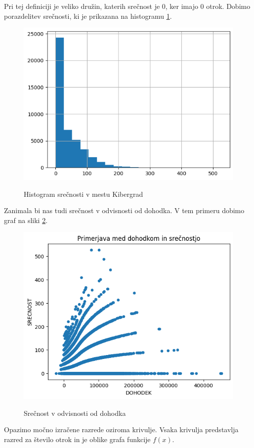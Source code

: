 \documentclass{article}
\begin{document}
Pri tej definiciji je veliko družin, katerih srečnost je 0, ker imajo 0 otrok. Dobimo porazdelitev srečnosti, ki je prikazana na histogramu \ref{fig:slika4}.

\begin{figure}[H]
    \caption{Histogram srečnosti v mestu Kibergrad}
    \centering 
    \includegraphics[scale=0.8]{histogram_srecnosti.png}
    \label{fig:slika4}
\end{figure}

Zanimala bi nas tudi srečnost v odvisnosti od dohodka. V tem primeru dobimo graf na sliki \ref{fig:slika5}.

\begin{figure}[H]
    \caption{Srečnost v odvisnosti od dohodka}
    \centering
    \includegraphics[scale=0.6]{dohodek_in_srecnost.png}
    \label{fig:slika5}
\end{figure}

Opazimo močno izračene razrede oziroma krivulje. Vsaka krivulja predstavlja razred za število 
otrok in je oblike grafa funkcije $f(x)$. 
\end{document}
